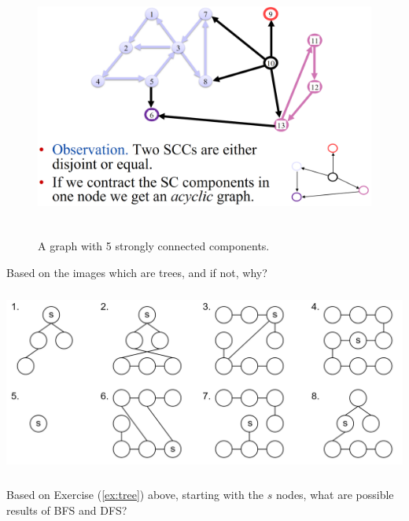 \vspace{3em}
\begin{figure}[h]
    \begin{center}
      \includegraphics[height=3.4in]{./Sections/graphs/dag/strong_conn.png}
    \end{center}
     \caption{A graph with 5 strongly connected components.}\label{fig:strong_conn}
\end{figure}

\newpage 

\begin{Exercise}Based on the images which are trees, and if not, why?

    \label{ex:tree}
    \vspace{1em}
    \hspace{-2em}
    \includegraphics[height=2.4in]{./Sections/graphs/dag/tree_example.png}

\end{Exercise}

\begin{Exercise} Based on Exercise (\ref{ex:tree}) above, starting with the $s$ nodes,
    what are possible results of BFS and DFS?
\end{Exercise}

